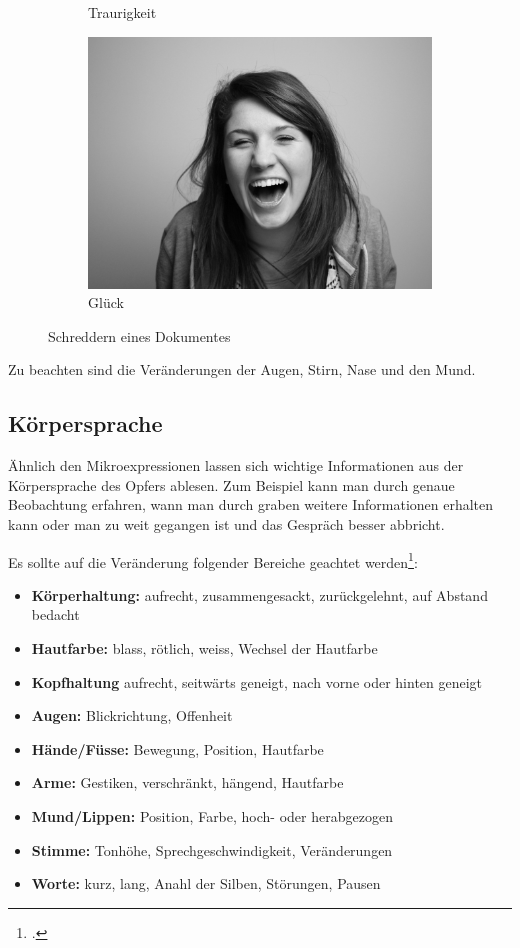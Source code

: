 \begin{figure}[htb]
\begin{subfigure}[b]{.30\linewidth}
		\caption{Traurigkeit}
		\label{fig:socialengineering:weiteretechniken:mikroexpressionen:traurigkeit}
	\end{subfigure}
	\begin{subfigure}[b]{.30\linewidth}
		\centering
		\includegraphics[width=0.5\linewidth]{images/mikroexpression-glueck.jpg}
		\caption{Glück}
		\label{fig:socialengineering:weiteretechniken:mikroexpressionen:glueck}
	\end{subfigure}
  \caption{Schreddern eines Dokumentes}
  \label{fig:socialengineering:weiteretechniken:mikroexpressionen}
\end{figure}

Zu beachten sind die Veränderungen der Augen, Stirn, Nase und den Mund. 

\subsection{Körpersprache}
Ähnlich den Mikroexpressionen lassen sich wichtige Informationen aus der Körpersprache des Opfers ablesen. Zum Beispiel kann man durch genaue Beobachtung erfahren, wann man durch graben weitere Informationen erhalten kann oder man zu weit gegangen ist und das Gespräch besser abbricht.

Es sollte auf die Veränderung folgender Bereiche geachtet werden\footcite{human_hacking}:
\begin{itemize}
\item \textbf{Körperhaltung:} aufrecht, zusammengesackt, zurückgelehnt, auf Abstand bedacht
\item \textbf{Hautfarbe:} blass, rötlich, weiss, Wechsel der Hautfarbe
\item \textbf{Kopfhaltung} aufrecht, seitwärts geneigt, nach vorne oder hinten geneigt
\item \textbf{Augen:} Blickrichtung, Offenheit
\item \textbf{Hände/Füsse:} Bewegung, Position, Hautfarbe
\item \textbf{Arme:} Gestiken, verschränkt, hängend, Hautfarbe
\item \textbf{Mund/Lippen:} Position, Farbe, hoch- oder herabgezogen
\item \textbf{Stimme:} Tonhöhe, Sprechgeschwindigkeit, Veränderungen
\item \textbf{Worte:} kurz, lang, Anahl der Silben, Störungen, Pausen
\end{itemize}

